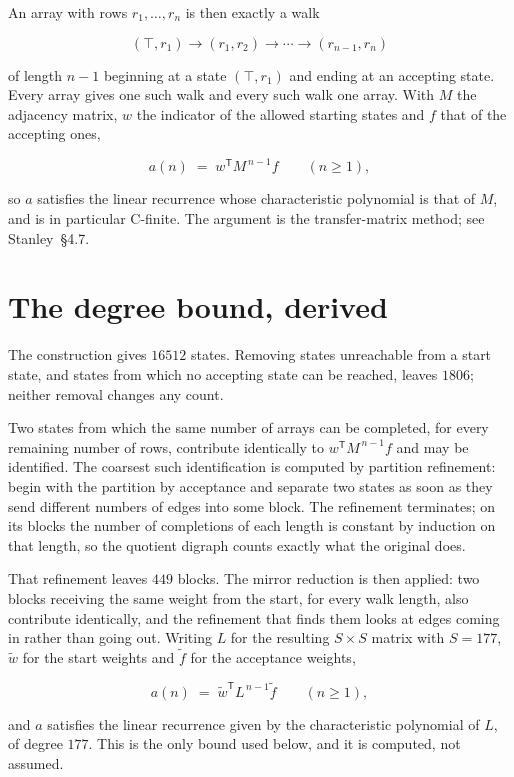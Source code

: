 \documentclass[11pt]{article}
\theoremstyle{definition}
\begin{document}
An array with rows $r_1,\dots,r_n$ is then exactly a walk

\[(\top,r_1) \to (r_1,r_2) \to \cdots \to (r_{n-1},r_n)\]

of length $n-1$ beginning at a state $(\top,r_1)$ and ending at an accepting state. Every array gives one such walk and every such walk one array. With $M$ the adjacency matrix, $w$ the indicator of the allowed starting states and $f$ that of the accepting ones,

\[a(n) \;=\; w^{\mathsf T} M^{\,n-1} f \qquad (n \ge 1),\]

so $a$ satisfies the linear recurrence whose characteristic polynomial is that of $M$, and is in particular C-finite. The argument is the transfer-matrix method; see Stanley~\S4.7.

\section{The degree bound, derived}

The construction gives $16512$ states. Removing states unreachable from a start state, and states from which no accepting state can be reached, leaves $1806$; neither removal changes any count.

Two states from which the same number of arrays can be completed, for every remaining number of rows, contribute identically to $w^{\mathsf T}M^{\,n-1}f$ and may be identified. The coarsest such identification is computed by partition refinement: begin with the partition by acceptance and separate two states as soon as they send different numbers of edges into some block. The refinement terminates; on its blocks the number of completions of each length is constant by induction on that length, so the quotient digraph counts exactly what the original does.

That refinement leaves $449$ blocks. The mirror reduction is then applied: two blocks receiving the same weight from the start, for every walk length, also contribute identically, and the refinement that finds them looks at edges coming in rather than going out. Writing $L$ for the resulting $S \times S$ matrix with $S = 177$, $\tilde w$ for the start weights and $\tilde f$ for the acceptance weights,

\[a(n) \;=\; \tilde w^{\mathsf T} L^{\,n-1} \tilde f \qquad (n \ge 1),\]

and $a$ satisfies the linear recurrence given by the characteristic polynomial of $L$, of degree $177$. This is the only bound used below, and it is computed, not assumed.
\end{document}
